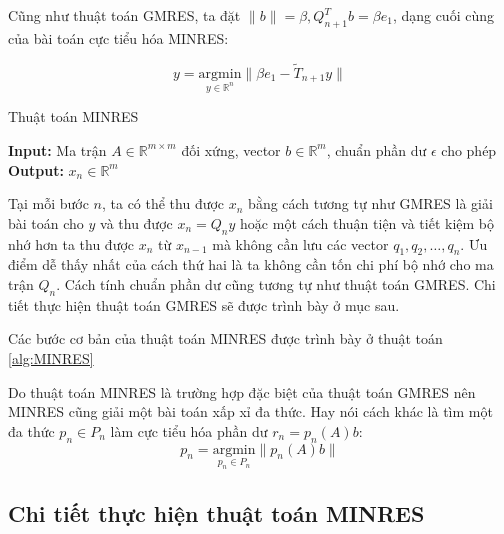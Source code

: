 \documentclass[14pt, a4paper]{article}
\numberwithin{equation}{section}
\numberwithin{algorithm}{section}
\numberwithin{figure}{section}
\numberwithin{dl}{section}
\numberwithin{md}{section}
\numberwithin{bd}{section}
\numberwithin{dn}{section}
\begin{document}
Cũng như thuật toán GMRES, ta đặt $\lVert b \rVert= \beta, Q_{n+1}^T b=\beta e_1$, dạng cuối cùng của bài toán cực tiểu hóa MINRES:

\begin{equation}
    y = \underset{y \in \mathbb{R}^n}{\mathrm{argmin}} \lVert \beta e_1 - \widetilde{T}_{n+1} y \rVert 
\end{equation}



\begin{algorithm}
    \caption{Thuật toán MINRES}\label{alg:MINRES}
    \hspace*{\algorithmicindent} \textbf{Input:} {Ma trận $A \in \mathbb{R}^{m \times m}$ đối xứng, vector $b \in \mathbb{R}^m$, chuẩn phần dư $\epsilon$ cho phép} \\
    \hspace*{\algorithmicindent} \textbf{Output:} {$x_n \in \mathbb{R}^m$}
    \begin{algorithmic}
        \EndFor
    \end{algorithmic}
\end{algorithm}

Tại mỗi bước $n$, ta có thể thu được $x_n$ bằng cách tương tự như GMRES là giải bài toán cho $y$ và thu được $x_n = Q_n y$ hoặc một cách thuận tiện và tiết kiệm bộ nhớ hơn ta thu được $x_n$ từ $x_{n-1}$ mà không cần lưu các vector $q_1, q_2, \dots, q_n$. Ưu điểm dễ thấy nhất của cách thứ hai là ta không cần tốn chi phí bộ nhớ cho ma trận $Q_n$.
Cách tính chuẩn phần dư cũng tương tự như thuật toán GMRES. Chi tiết thực hiện thuật toán GMRES sẽ được trình bày ở mục sau.

Các bước cơ bản của thuật toán MINRES được trình bày ở thuật toán \ref{alg:MINRES}

Do thuật toán MINRES là trường hợp đặc biệt của thuật toán GMRES nên MINRES cũng giải một bài toán xấp xỉ đa thức. Hay nói cách khác là tìm một đa thức $p_n \in P_n$ làm cực tiểu hóa phần dư $r_n = p_n(A)b$:
\begin{equation}
    p_n = \underset{p_n \in P_n}{\mathrm{argmin}} \lVert p_n(A)b \rVert
\end{equation}

\subsection{Chi tiết thực hiện thuật toán MINRES}
\end{document}
